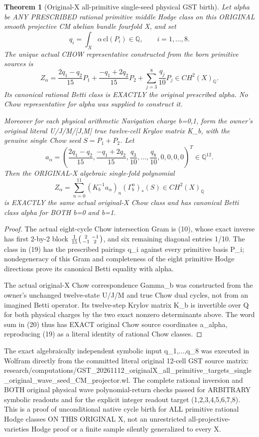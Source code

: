 \documentclass[11pt]{article}
\newtheorem{theorem}{Theorem}
\begin{document}
\begin{theorem}[Original-X all-primitive single-seed physical GST birth]
Let alpha be ANY PRESCRIBED rational
primitive middle Hodge class on this
ORIGINAL smooth projective CM abelian
bundle fourfold X, and set
\[
q_i=\int_X\alpha\,\mathrm{cl}(P_i)
\in\mathbb Q,\qquad i=1,\ldots,8.
\]
The unique actual CHOW representative
constructed from the born primitive
sources is
\[
\boxed{
Z_\alpha=
\frac{2q_1-q_2}{15}P_1+
\frac{-q_1+2q_2}{15}P_2+
\sum_{j=3}^{8}\frac{q_j}{10}P_j
\in CH^2(X)_{\mathbb Q}.}
\tag{19}
\]
Its canonical rational Betti class is
EXACTLY the original prescribed alpha.
No Chow representative for alpha
was supplied to construct it.

Moreover for each physical arithmetic
Navigation charge b=0,1, form
the owner's original literal
U/J/M/[J,M] true twelve-cell
Krylov matrix K_b, with the
genuine single Chow seed
\(S=P_1+P_2\).
Let
\[
a_\alpha=\left(
\frac{2q_1-q_2}{15},
\frac{-q_1+2q_2}{15},
\frac{q_3}{10},\ldots,\frac{q_8}{10},
0,0,0,0
\right)^T\in\mathbb Q^{12}.
\]
Then the ORIGINAL-X algebraic
single-fold polynomial
\[
\boxed{
Z_\alpha=
\sum_{n=0}^{11}
(K_b^{-1}a_\alpha)_n
(\Gamma_b^n)_*(S)
\in CH^2(X)_{\mathbb Q}
}
\tag{20}
\]
is EXACTLY the same actual original-X
Chow class and has canonical Betti
class alpha for BOTH b=0 and b=1.
\end{theorem}
\begin{proof}
The actual eight-cycle Chow intersection
Gram is (10), whose exact inverse has
first 2-by-2 block
\(\frac1{15}\begin{psmallmatrix}
2&-1\\-1&2
\end{psmallmatrix}\),
and six remaining diagonal entries 1/10.
The class in (19) has the prescribed
pairings q_i against every primitive
basis P_i; nondegeneracy of this
Gram and completeness of the eight
primitive Hodge directions prove its
canonical Betti equality with alpha.

The actual original-X Chow
correspondence Gamma_b was
constructed from the owner's unchanged
twelve-state U/J/M and true Chow
dual cycles, not from an imagined
Betti operator. Its twelve-step
Krylov matrix K_b is invertible
over Q for both physical charges
by the two exact nonzero
determinants above. The word
sum in (20) thus has EXACT
original Chow source coordinates
a_alpha, reproducing (19)
as a literal identity of
rational Chow classes.
\end{proof}

The exact algebraically independent
symbolic input q_1,...,q_8 was
executed in Wolfram directly from
the committed literal original
12-cell GST source matrix:
research/computations/GST_20261112_originalX_all_primitive_targets_single_original_wave_seed_CM_projector.wl.
The complete rational inversion and
BOTH original physical wave
polynomial-return checks passed
for ARBITRARY symbolic readouts
and for the explicit integer
readout target (1,2,3,4,5,6,7,8).
This is a proof of unconditional
native cycle birth for ALL
primitive rational Hodge classes
ON THIS ORIGINAL X, not an
unrestricted all-projective-varieties
Hodge proof or a finite sample
silently generalized to every X.
\end{document}

